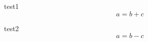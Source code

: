 \documentclass[preview]{standalone}
\begin{document}
\begin{docimage}{test1}
\begin{equation*}%
  a = b + c
\end{equation*}
\end{docimage} 

\begin{docimage}{test2}
\begin{equation*}%
  a = b - c
\end{equation*}
\end{docimage} 
\end{document}
